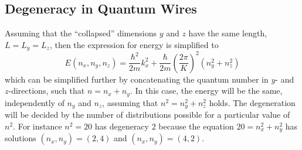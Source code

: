 \documentclass[11pt]{amsart}
\begin{document}
\subsection{Degeneracy in Quantum Wires}
Assuming that the ``collapsed'' dimensions $y$ and $z$ have the same length, $L=L_y =L_z$, then the expression for energy is simplified to
\begin{equation}
E(n_x, n_y, n_z) = \frac{\hbar^2}{2m}k_x^2 + \frac{\hbar}{2m}\left(\frac{2\pi}{K} \right)^2 (n_y^2 + n_z^2)
\end{equation}
which can be simplified further by concatenating the quantum number in $y$- and $z$-directions, such that $n = n_x + n_y$. In this case, the energy will be the same, independently of $n_y$ and $n_z$, assuming that $n^2 = n_y^2 + n_z^2$ holds. The degeneration will be decided by the number of distributions possible for a particular value of $n^2$. For instance $n^2 = 20$ has degeneracy $2$ because the equation $20 = n_x^2 + n_y^2$ has solutions $(n_x, n_y) = (2, 4)$ and $(n_x, n_y) = (4, 2)$.
\end{document}

